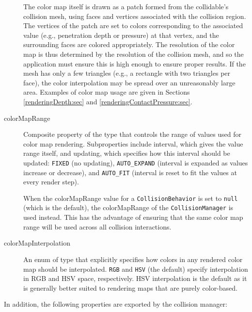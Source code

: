 \begin{description}
The color map itself is drawn as a patch formed from the collidable's
collision mesh, using faces and vertices associated with the collision
region. The vertices of the patch are set to colors corresponding to
the associated value (e.g., penetration depth or pressure) at that
vertex, and the surrounding faces are colored appropriately.  The
resolution of the color map is thus determined by the resolution of
the collision mesh, and so the application must ensure this is high
enough to ensure proper results. If the mesh has only a few triangles
(e.g., a rectangle with two triangles per face), the color
interpolation may be spread over an unreasonably large area.  Examples
of color map usage are given in Sections \ref{renderingDepth:sec} and
\ref{renderingContactPressure:sec}.

\item[colorMapRange]\mbox{}

Composite property of the type
 that controls the range
of values used for color map rendering. Subproperties include {\sf
interval}, which gives the value range itself, and {\sf updating},
which specifies how this interval should be updated: {\tt FIXED} (no
updating), {\tt AUTO\_EXPAND} (interval is expanded as values increase
or decrease), and {\tt AUTO\_FIT} (interval is reset to fit the values
at every render step).

When the {\sf colorMapRange} value for a {\tt CollisionBehavior} is
set to {\tt null} (which is the default), the {\sf colorMapRange} of
the {\tt CollisionManager} is used instead. This has the advantage of
ensuring that the same color map range will be used across all
collision interactions.

\item[colorMapInterpolation]\mbox{}

An enum of type
 that explicitly
specifies how colors in any rendered color map should be interpolated.
{\tt RGB} and {\tt HSV} (the default) specify interpolation in RGB and
HSV space, respectively. HSV interpolation is the default as it is
generally better suited to rendering maps that are purely color-based.

\end{description}

In addition, the following properties are exported by the collision
manager:

